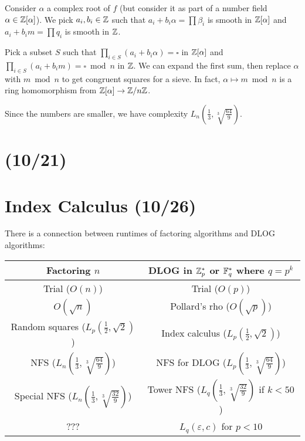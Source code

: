 \documentclass[notes]{agony}
\begin{document}
Consider $\alpha$ a complex root of $f$
(but consider it as part of a number field $\alpha \in \mathbb{Z}[\alpha]$).
We pick $a_i,b_i \in \mathbb{Z}$ such that $a_i+b_i\alpha = \prod\beta_i$ is smooth in $\mathbb{Z}[\alpha]$
and $a_i+b_im = \prod q_i$ is smooth in $\mathbb{Z}$.

Pick a subset $S$ such that $\prod_{i\in S}(a_i + b_i\alpha) = \square$ in $\mathbb{Z}[\alpha]$
and $\prod_{i\in S}(a_i + b_i m) = \square \bmod n$ in $\mathbb{Z}$.
We can expand the first sum, then replace $\alpha$ with $m \bmod n$
to get congruent squares for a sieve.
In fact, $\alpha \mapsto m \bmod n$ is a ring homomorphism from $\mathbb{Z}[\alpha] \to \mathbb{Z}/n\mathbb{Z}$.

Since the numbers are smaller, we have complexity $L_n(\frac13, \sqrt[3]{\frac{64}{9}})$.

\section{(10/21)}

\section{Index Calculus (10/26)}

There is a connection between runtimes of
factoring algorithms and DLOG algorithms:
\begin{center}
  \begin{tabular}{c|c}
    Factoring $n$                                       & DLOG in $\mathbb{Z}_p^*$ or $\mathbb{F}_q^*$ where $q = p^k$                  \\ \hline
    Trial ($O(n)$)                                      & Trial ($O(p)$)                                                \\
    $O(\sqrt{n})$                                       & Pollard's rho ($O(\sqrt{p})$)                                 \\
    Random squares ($L_p(\frac12,\sqrt2)$)              & Index calculus ($L_p(\frac12,\sqrt2)$)                        \\
    NFS ($L_n(\frac13,\sqrt[3]{\frac{64}{9}})$)         & NFS for DLOG ($L_p(\frac13,\sqrt[3]{\frac{64}{9}})$)          \\
    Special NFS ($L_n(\frac13,\sqrt[3]{\frac{32}{9}})$) & Tower NFS ($L_q(\frac13,\sqrt[3]{\frac{32}{9}})$ if $k < 50$) \\
    ???                                                 & $L_q(\varepsilon, c)$ for $p < 10$
  \end{tabular}
\end{center}
\end{document}
